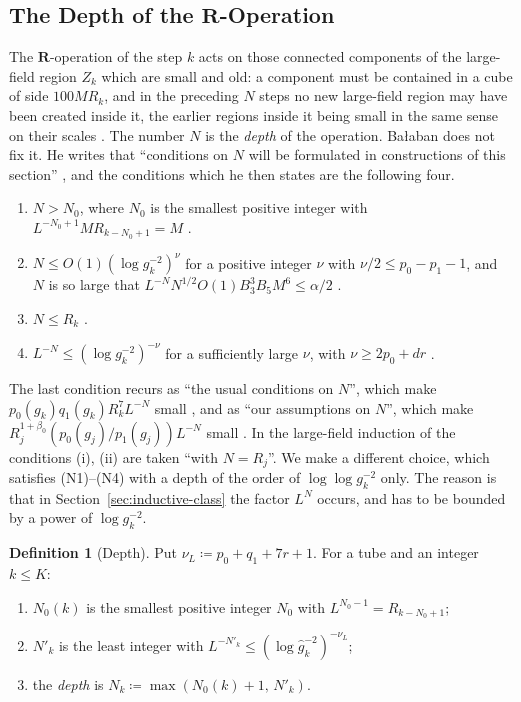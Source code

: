 \documentclass[11pt]{preprint}
\numberwithin{equation}{section}
\theoremstyle{definition}
\newtheorem{definition}[theorem]{Definition}
\theoremstyle{remark}
\theoremstyle{plain}
\begin{document}
\subsection{The Depth of the \texorpdfstring{$\mathbf R$}{R}-Operation}\label{sec:depth}

The $\mathbf R$-operation of the step $k$ acts on those connected components of the large-field region $Z_k$ which are small and old: a component must be contained in a cube of side $100MR_k$, and in the preceding $N$ steps no new large-field region may have been created inside it, the earlier regions inside it being small in the same sense on their scales \cite[p.~177, (i), (ii)]{BalabanLFR1}. The number $N$ is the \emph{depth} of the operation. Ba{\l}aban does not fix it. He writes that ``conditions on $N$ will be formulated in constructions of this section'' \cite[p.~177]{BalabanLFR1}, and the conditions which he then states are the following four.
\begin{enumerate}[label=(N\arabic*)]
\item $N > N_0$, where $N_0$ is the smallest positive integer with $L^{-N_0+1}MR_{k-N_0+1} = M$ \cite[p.~179]{BalabanLFR1}.
\item $N \leq O(1)(\log g_k^{-2})^{\nu}$ for a positive integer $\nu$ with $\nu/2 \leq p_0 - p_1 - 1$, and $N$ is so large that $L^{-N}N^{1/2}O(1)B_3^3B_5M^6 \leq \alpha/2$ \cite[(1.94), p.~198]{BalabanLFR1}.
\item $N \leq R_k$ \cite[p.~361]{BalabanLFR2}.
\item $L^{-N} \leq (\log g_k^{-2})^{-\nu}$ for a sufficiently large $\nu$, with $\nu \geq 2p_0 + dr$ \cite[p.~363]{BalabanLFR2}.
\end{enumerate}
The last condition recurs as ``the usual conditions on $N$'', which make $p_0(g_k)q_1(g_k)R_k^7L^{-N}$ small \cite[(1.47), p.~368]{BalabanLFR2}, and as ``our assumptions on $N$'', which make $R_j^{1+\beta_0}(p_0(g_j)/p_1(g_j))L^{-N}$ small \cite[p.~382]{BalabanLFR2}. In the large-field induction of \cite[p.~384]{BalabanLFR2} the conditions (i), (ii) are taken ``with $N = R_j$''. We make a different choice, which satisfies (N1)--(N4) with a depth of the order of $\log\log g_k^{-2}$ only. The reason is that in Section~\ref{sec:inductive-class} the factor $L^N$ occurs, and has to be bounded by a power of $\log g_k^{-2}$.

\begin{definition}[Depth]\label{def:depth}
Put $\nu_L \coloneqq p_0 + q_1 + 7r + 1$. For a tube and an integer $k \leq K$:
\begin{enumerate}[label=(\roman*)]
\item $N_0(k)$ is the smallest positive integer $N_0$ with $L^{N_0-1} = R_{k-N_0+1}$;
\item $N'_k$ is the least integer with $L^{-N'_k} \leq (\log\hat g_k^{-2})^{-\nu_L}$;
\item the \emph{depth} is $N_k \coloneqq \max(N_0(k) + 1,\, N'_k)$.
\end{enumerate}
\end{definition}
\end{document}
